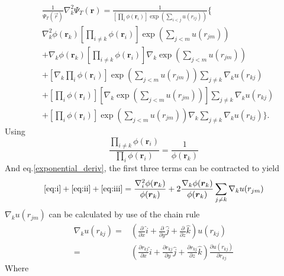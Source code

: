 \documentclass[
    a4paper, aps, twocolumn, floatfix, superscriptaddress,
    nofootinbib]{revtex4-1}
\begin{document}
\begin{appendices}
\begin{align}
   & \frac{1}{\Psi_T(\vec r)} \nabla^{2}_{k} \Psi_{T}(\boldsymbol{r}) = \frac{1}{\left[\prod_{i}\phi(\boldsymbol{r}_i)\right]\exp\left({\sum^{}_{i<j} u(r_{ij})}\right)} \Bigg\{ \\ &\nabla^{2}_{k}\phi(\boldsymbol{r}_k)\left[ \prod_{i \neq k} \phi(\boldsymbol{r}_i) \right] \exp\left(\sum_{j<m} u(r_{jm}) \right) \tag{i}\label{eq:i} \\
    &+\nabla_{k}\phi(\boldsymbol{r}_k)\left[ \prod_{i \neq k} \phi(\boldsymbol{r}_i) \right] \nabla_{k}\exp\left(\sum_{j<m} u(r_{jm})\right) \tag{ii}\label{eq:ii}\\
    &+\left[\nabla_k \prod_{i} \phi(\boldsymbol{r}_i)\right]  \exp\left(\sum_{j<m} u(r_{jm})\right) \sum_{j\neq k} \nabla_{k} 
    u(r_{kj})  \tag{iii}\label{eq:iii}
    \\\
    &+\left[\prod_{i} \phi(\boldsymbol{r}_i)\right] \left[ \nabla_k \exp\left(\sum_{j<m} u(r_{jm})\right) \right] \sum_{j\neq k} \nabla_{k} u(r_{kj})  \tag{iv}\label{eq:iv}\\
    &+
    \left[\prod_{i} \phi(\boldsymbol{r}_i)\right] \exp\left(\sum_{j<m} u(r_{jm})\right) \nabla_k \sum_{j\neq k} \nabla_{k} u(r_{kj}) \Bigg\} \Bigg. \tag{v}\label{eq:v}
\end{align}
Using 
\begin{equation*}
    \frac{\prod_{i \neq k} \phi(\boldsymbol{r}_i)}{\prod_i \phi(\boldsymbol{r}_i)} = \frac{1}{\phi(\boldsymbol{r}_k)}
\end{equation*}
And eq.\eqref{exponential_deriv}, the first three terms can be contracted to yield
\begin{equation}\label{i+ii+iii}
    \eqref{eq:i}+\eqref{eq:ii} + \eqref{eq:iii} = \frac{\nabla_i^2 \phi(\boldsymbol{r}_k)}{\phi(\boldsymbol{r}_k)} + 2\frac{\nabla_k \phi(\boldsymbol{r}_k)}{\phi(\boldsymbol{r}_k)} \sum_{j\neq k} \nabla_k u(r_{jm})
\end{equation}
$\nabla_k u(r_{jm})$ can be calculated by use of the chain rule
\begin{align}\label{grad_k_u}
    \nabla_k u(r_{kj}) =& \left( \frac{\partial}{\partial x} \hat{i} + \frac{\partial}{\partial y} \hat{j} + \frac{\partial}{\partial z} \hat{k} \right) u(r_{kj}) \\
    = &\left( \frac{\partial r_{kj}}{\partial x} \hat{i} + \frac{\partial r_{kj}}{\partial y} \hat{j} + \frac{\partial r_{kj}}{\partial z} \hat{k} \right) \frac{\partial u(r_{kj})}{\partial r_{kj}} \nonumber
\end{align}
 Where

\end{appendices}
\end{document}
